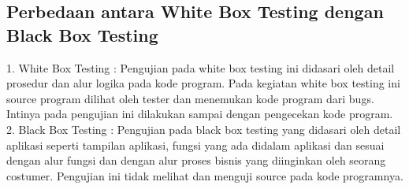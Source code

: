 \subsection { Perbedaan antara White Box Testing dengan Black Box Testing}
1.	White Box Testing :
 Pengujian pada white box testing ini didasari oleh detail prosedur dan alur logika pada kode program. Pada kegiatan white box testing ini source program dilihat oleh tester dan menemukan kode program dari bugs. Intinya pada pengujian ini dilakukan sampai dengan pengecekan kode program. 
2.	Black Box Testing : 
Pengujian pada black box testing yang didasari oleh detail aplikasi seperti tampilan aplikasi, fungsi yang ada didalam aplikasi dan sesuai dengan alur fungsi  dan dengan alur proses bisnis yang diinginkan oleh seorang costumer. Pengujian ini  tidak melihat dan menguji source pada kode programnya. 
